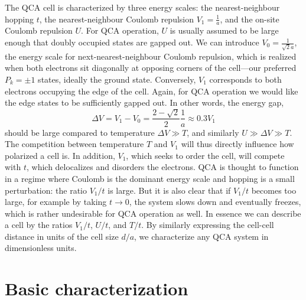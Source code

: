 The QCA cell is characterized by three energy scales: the nearest-neighbour
hopping $t$, the nearest-neighbour Coulomb repulsion $V_1 = \frac{1}{a}$, and
the on-site Coulomb repulsion $U$. For QCA operation, $U$ is usually assumed to
be large enough that doubly occupied states are gapped out. We can introduce
$V_0 = \frac{1}{\sqrt{2} a}$, the energy scale for next-nearest-neighbour
Coulomb repulsion, which is realized when both electrons sit diagonally at
opposing corners of the cell---our preferred $P_k=\pm1$ states, ideally the
ground state. Conversely, $V_1$ corresponds to both electrons occupying the edge
of the cell. Again, for QCA operation we would like the edge states to be
sufficiently gapped out. In other words, the energy gap, 
\begin{equation}
  \label{eq:deltaV}
  \Delta V = V_1 - V_0 = \frac{2 - \sqrt{2}}{2} \frac{1}{a} \approx 0.3 V_1
\end{equation}
should be large compared to temperature $\Delta V \gg T$, and similarly $U \gg
\Delta V \gg T$. The competition between temperature $T$ and $V_1$ will thus
directly influence how polarized a cell is. In addition, $V_1$, which seeks to
order the cell, will compete with $t$, which delocalizes and disorders the
electrons. QCA is thought to function in a regime where Coulomb is the dominant
energy scale and hopping is a small perturbation: the ratio $V_1/t$ is large.
But it is also clear that if $V_1/t$ becomes too large, for example by taking $t
\rightarrow 0$, the system slows down and eventually freezes, which is rather
undesirable for QCA operation as well. In essence we can describe a cell by the
ratios $V_1/t$, $U/t$, and $T/t$. By similarly expressing the cell-cell distance
in units of the cell size $d/a$, we characterize any QCA system in dimensionless
units.


\section{Basic characterization}
\label{sec:basic_characterization}

